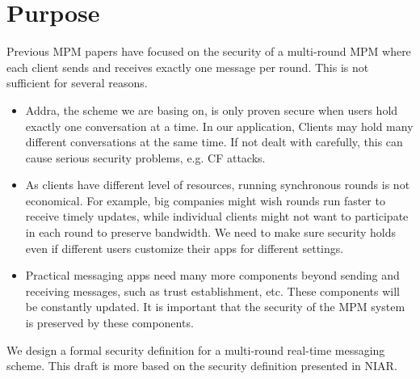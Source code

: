 \section{Purpose}
Previous MPM papers have focused on the security of a multi-round MPM where each client sends and receives exactly one message per round. This is not sufficient for several reasons.
\begin{itemize}
    \item Addra, the scheme we are basing on, is only proven secure when users hold exactly one conversation at a time. In our application, Clients may hold many different conversations at the same time. If not dealt with carefully, this can cause serious security problems, e.g. CF attacks. 
    \item As clients have different level of resources, running synchronous rounds is not economical. For example, big companies might wish rounds run faster to receive timely updates, while individual clients might not want to participate in each round to preserve bandwidth. We need to make sure security holds even if different users customize their apps for different settings.
    \item Practical messaging apps need many more components beyond sending and receiving messages, such as trust establishment, etc. These components will be constantly updated. It is important that the security of the MPM system is preserved by these components.
\end{itemize}


We design a formal security definition for a multi-round real-time messaging scheme. This draft is more based on the security definition presented in NIAR. 



